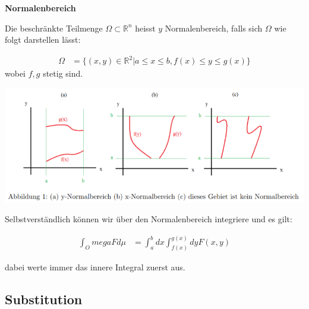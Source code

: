 \documentclass[25pt]{sciposter}
\newcommand{\R}{\mathbb{R}}
\newenvironment{method}[1]{\begin{mdframed}[backgroundcolor=blue!10,innertopmargin=15pt, innerbottommargin=15pt, nobreak=true]
		\textbf{#1 }
	}
	{ 
	\end{mdframed}
}
\begin{document}
\begin{multicols}{3}
\begin{method}{Normalenbereich}
	Die beschränkte Teilmenge $\Omega \subset \R^n$ heisst $y$ Normalenbereich, falls sich $\Omega$ wie folgt darstellen lässt:
	
	\begin{align*}
		\Omega &= \{(x,y)\in\R^2 | a \leq x \leq b, f(x)\leq y \leq g(x)\}
	\end{align*}
	wobei $f,g$ stetig sind.
	
	\includegraphics[width=\textwidth]{normBe.png}
	
	Selbstverständlich können wir über den Normalenbereich integriere und es gilt:
	
	\begin{align*}
		\int_Omega F d\mu &= \int_{a}^{b} dx \int_{f(x)}^{g(x)} dy F(x,y)
	\end{align*}
	
	dabei werte immer das innere Integral zuerst aus.
\end{method}


\subsection*{Substitution}


\end{multicols}
\end{document}
